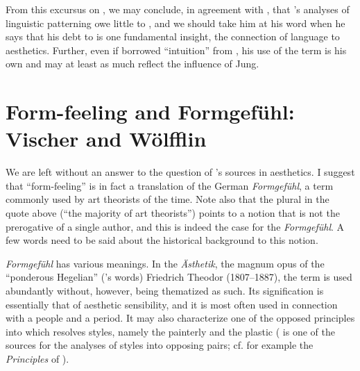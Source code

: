 \documentclass[output=paper]{langscibook}
\begin{document}
From this excursus on {\Croce}, we may conclude, in agreement with \citet[441]{Handler1986}, that {\Sapir}'s analyses of linguistic patterning owe little to {\Croce}, and we should take him at his word when he says that his debt to {\Croce} is one fundamental insight, the connection of language to aesthetics. Further, even if {\Sapir} borrowed ``intuition'' from {\Croce}, his use of the term is his own and may at least as much reflect the influence of Jung.

\section{Form-feeling and Formgefühl: Vischer and Wölfflin}
\label{sec:fortis:vischerwoelfflin}

We are left without an answer to the question of {\Sapir}'s sources in aesthetics. I suggest that ``form-feeling'' is in fact a translation of the German \emph{Formgefühl}, a term commonly used by art theorists of the time. Note also that the plural in the quote above (``the majority of art theorists'') points to a notion that is not the prerogative of a single author, and this is indeed the case for the \emph{Formgefühl}. A few words need to be said about the historical background to this notion.

\emph{Formgefühl} has various meanings. In the \emph{Ästhetik}, the magnum opus of the ``ponderous Hegelian'' ({\Croce}'s words) Friedrich Theodor {\Vischer} (1807--1887), the term is used abundantly without, however, being thematized as such. Its signification is essentially that of aesthetic sensibility, and it is most often used in connection with a people and a period. It may also characterize one of the opposed principles into which {\Vischer} resolves styles, namely the painterly and the plastic ({\Vischer} is one of the sources for the analyses of styles into opposing pairs; cf. for example the \emph{Principles} of {}).
\end{document}
